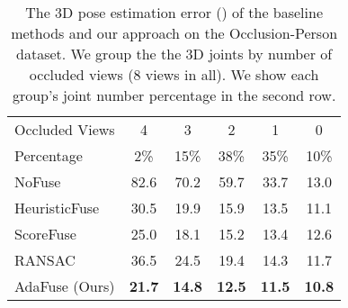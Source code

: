 \begin{table}[]
\centering
\caption{The 3D pose estimation error () of the baseline methods and our approach on the Occlusion-Person dataset. We group the the 3D joints by number of occluded views (8 views in all). We show each group's joint number percentage in the second row.}
\label{table:unreal_occluded_mpjpe}
\begin{tabular}{l|ccccc}
\toprule
Occluded Views   & 4    & 3    & 2    & 1    & 0    \\ 
Percentage       &2\%	 & 15\%	& 38\%&	35\%&	10\% \\ \hline
NoFuse           & 82.6 & 70.2 & 59.7 & 33.7 & 13.0 \\
HeuristicFuse    & 30.5 & 19.9 & 15.9 & 13.5 & 11.1 \\
ScoreFuse        & 25.0 & 18.1 & 15.2 & 13.4 & 12.6 \\
RANSAC           & 36.5 & 24.5 & 19.4 & 14.3 & 11.7 \\
AdaFuse  (Ours)  & \textbf{21.7} & \textbf{14.8} & \textbf{12.5} & \textbf{11.5} & \textbf{10.8} \\
\toprule
\end{tabular}
\end{table}




